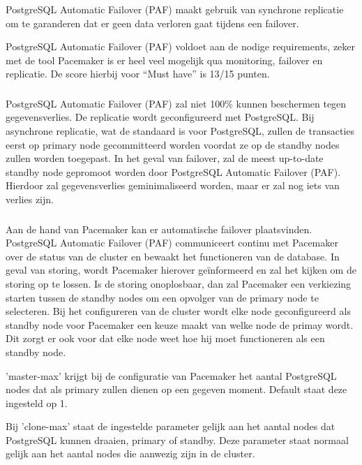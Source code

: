 PostgreSQL Automatic Failover (PAF) maakt gebruik van synchrone replicatie om te garanderen dat er geen data verloren gaat tijdens een failover.

PostgreSQL Automatic Failover (PAF) voldoet aan de nodige requirements, zeker met de tool Pacemaker is er heel veel mogelijk qua monitoring, failover en replicatie. De score hierbij voor “Must have” is 13/15 punten.


\subsubsection{}
\label{subsubsec:Replicatie}

PostgreSQL Automatic Failover (PAF) zal niet 100\% kunnen beschermen tegen gegevensverlies. De replicatie wordt geconfigureerd met PostgreSQL. Bij asynchrone replicatie, wat de standaard is voor PostgreSQL, zullen de transacties eerst op primary node gecommitteerd worden voordat ze op de standby nodes zullen worden toegepast. In het geval van failover, zal de meest up-to-date standby node gepromoot worden door PostgreSQL Automatic Failover (PAF). Hierdoor zal gegevensverlies geminimaliseerd worden, maar er zal nog iets van verlies zijn. 


\subsubsection{}
\label{subsubsec:Failover}

Aan de hand van Pacemaker kan er automatische failover plaatsvinden. PostgreSQL Automatic Failover (PAF) communiceert continu met Pacemaker over de status van de cluster en bewaakt het functioneren van de database. In geval van storing, wordt Pacemaker hierover geïnformeerd en zal het kijken om de storing op te lossen. Is de storing onoplosbaar, dan zal Pacemaker een verkiezing starten tussen de standby nodes om een opvolger van de primary node te selecteren.
Bij het configureren van de cluster wordt elke node geconfigureerd als standby node voor Pacemaker een keuze maakt van welke node de primay wordt. Dit zorgt er ook voor dat elke node weet hoe hij moet functioneren als een standby node.

'master-max' krijgt bij de configuratie van Pacemaker het aantal PostgreSQL nodes dat als primary zullen dienen op een gegeven moment. Default staat deze ingesteld op 1.

Bij 'clone-max' staat de ingestelde parameter gelijk aan het aantal nodes dat PostgreSQL kunnen draaien, primary of standby. Deze parameter staat normaal gelijk aan het aantal nodes die aanwezig zijn in de cluster.

